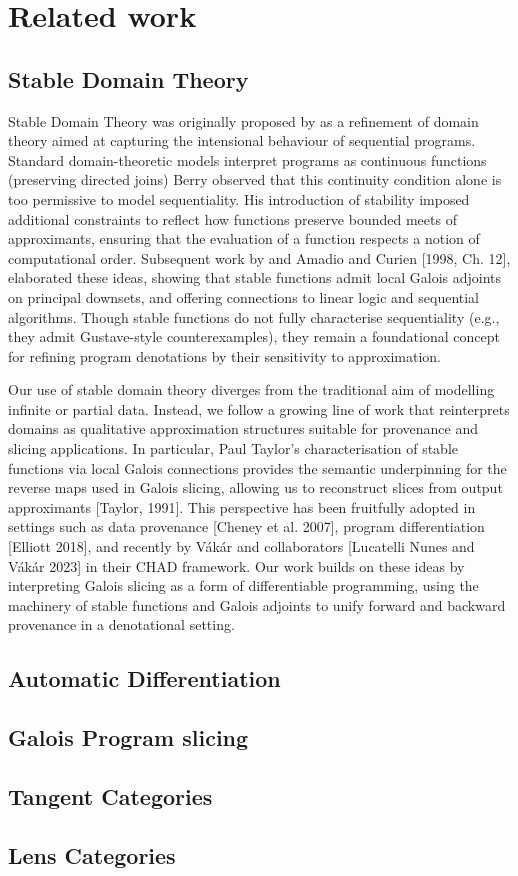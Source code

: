\section{Related work}

\subsection{Stable Domain Theory}

Stable Domain Theory was originally proposed by \citet{berry79} as a refinement of domain theory aimed at
capturing the intensional behaviour of sequential programs. Standard domain-theoretic models interpret
programs as continuous functions (preserving directed joins) Berry observed that this continuity condition
alone is too permissive to model sequentiality. His introduction of stability imposed additional constraints
to reflect how functions preserve bounded meets of approximants, ensuring that the evaluation of a function
respects a notion of computational order. Subsequent work by \citet{berry82} and Amadio and Curien [1998, Ch.
12], elaborated these ideas, showing that stable functions admit local Galois adjoints on principal downsets,
and offering connections to linear logic and sequential algorithms. Though stable functions do not fully
characterise sequentiality (e.g., they admit Gustave-style counterexamples), they remain a foundational
concept for refining program denotations by their sensitivity to approximation.

Our use of stable domain theory diverges from the traditional aim of modelling infinite or partial data.
Instead, we follow a growing line of work that reinterprets domains as qualitative approximation structures
suitable for provenance and slicing applications. In particular, Paul Taylor’s characterisation of stable
functions via local Galois connections provides the semantic underpinning for the reverse maps used in Galois
slicing, allowing us to reconstruct slices from output approximants [Taylor, 1991]. This perspective has been
fruitfully adopted in settings such as data provenance [Cheney et al. 2007], program differentiation [Elliott
2018], and recently by Vákár and collaborators [Lucatelli Nunes and Vákár 2023] in their CHAD framework. Our
work builds on these ideas by interpreting Galois slicing as a form of differentiable programming, using the
machinery of stable functions and Galois adjoints to unify forward and backward provenance in a denotational
setting.

\subsection{Automatic Differentiation}

\subsection{Galois Program slicing}

\cite{berry79,berry82}

\subsection{Tangent Categories}

\cite{cockett14,cockett18}

\subsection{Lens Categories}

\cite{spivak19}
